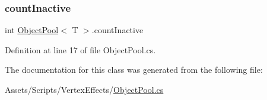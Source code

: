 \subsubsection{\texorpdfstring{count\+Inactive}{countInactive}}
{\footnotesize\ttfamily int \mbox{\hyperlink{class_object_pool}{Object\+Pool}}$<$ T $>$.count\+Inactive\hspace{0.3cm}{\ttfamily [get]}}



Definition at line 17 of file Object\+Pool.\+cs.



The documentation for this class was generated from the following file\+:\begin{DoxyCompactItemize}
\item 
Assets/\+Scripts/\+Vertex\+Effects/\mbox{\hyperlink{_object_pool_8cs}{Object\+Pool.\+cs}}\end{DoxyCompactItemize}
